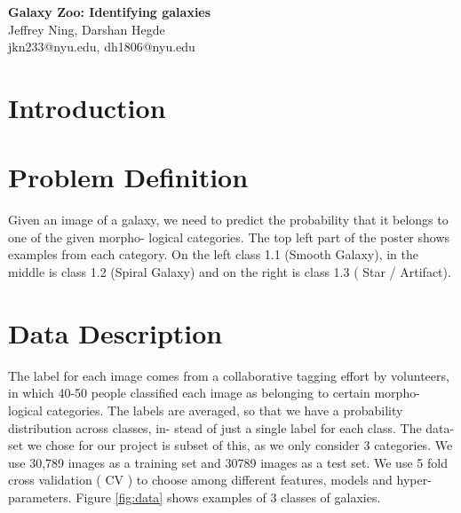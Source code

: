 \documentclass[10pt]{article}
\date{05/16/2014}
\begin{document}
\begin{flushleft}
{\Large
\textbf{Galaxy Zoo: Identifying galaxies}
}
\\
Jeffrey Ning, 
Darshan Hegde 
\\
jkn233@nyu.edu, dh1806@nyu.edu
\end{flushleft}

\section*{Introduction}


\section*{Problem Definition}

Given an image of a galaxy, we need to predict the probability that it belongs to one of the given morpho- logical categories. The top left part of the poster shows examples from each category. On the left class 1.1 (Smooth Galaxy), in the middle is class 1.2 (Spiral Galaxy) and on the right is class 1.3 ( Star / Artifact).

\section*{Data Description}

The label for each image comes from a collaborative tagging effort by volunteers, in which 40-50 people classified each image as belonging to certain morpho- logical categories. The labels are averaged, so that we have a probability distribution across classes, in- stead of just a single label for each class. The data- set we chose for our project is subset of this, as we only consider 3 categories. We use 30,789 images as a training set and 30789 images as a test set. We use 5 fold cross validation ( CV ) to choose among different features, models and hyper-parameters. Figure \ref{fig:data} shows examples of 3 classes of galaxies.  
\end{document}
